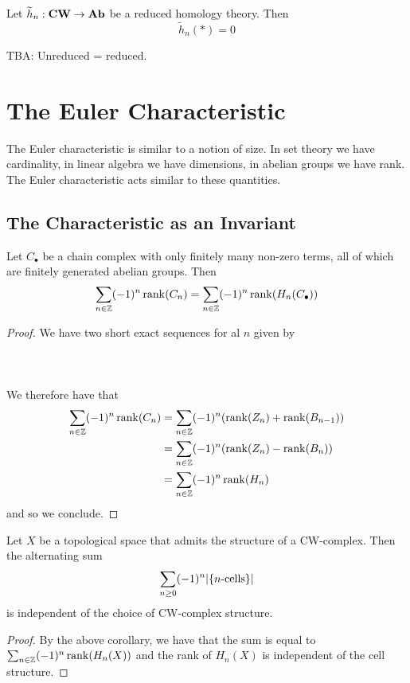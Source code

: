 \documentclass[a4paper]{article}
\begin{document}
\begin{lmm}{}{} Let $\widetilde{h}_n:\bold{CW}\to\bold{Ab}$ be a reduced homology theory. Then $$\widetilde{h}_n(\ast)=0$$
\end{lmm}

TBA: Unreduced = reduced. 

\pagebreak
\section{The Euler Characteristic}
The Euler characteristic is similar to a notion of size. In set theory we have cardinality, in linear algebra we have dimensions, in abelian groups we have rank. The Euler characteristic acts similar to these quantities. 

\subsection{The Characteristic as an Invariant}
\begin{crl}{}{} Let $C_\bullet$ be a chain complex with only finitely many non-zero terms, all of which are finitely generated abelian groups. Then $$\sum_{n\in\mathbb{Z}}(-1)^n\rank(C_n)=\sum_{n\in\mathbb{Z}}(-1)^n\rank(H_n(C_\bullet))$$ \tcbline
\begin{proof}
We have two short exact sequences for al $n$ given by \\~\\
\\~\\
We therefore have that 
\begin{align*}
\sum_{n\in\mathbb{Z}}(-1)^n\rank(C_n)&=\sum_{n\in\mathbb{Z}}(-1)^n(\rank(Z_n)+\rank(B_{n-1}))\\
&=\sum_{n\in\mathbb{Z}}(-1)^n(\rank(Z_n)-\rank(B_n))\\
&=\sum_{n\in\mathbb{Z}}(-1)^n\rank(H_n)
\end{align*}
and so we conclude. 
\end{proof}
\end{crl}

\begin{prp}{}{} Let $X$ be a topological space that admits the structure of a CW-complex. Then the alternating sum $$\sum_{n\geq 0}(-1)^n\abs{\{n\text{-cells}\}}$$ is independent of the choice of CW-complex structure. \tcbline
\begin{proof}
By the above corollary, we have that the sum is equal to $\sum_{n\in\mathbb{Z}}(-1)^n\rank(H_n(X))$ and the rank of $H_n(X)$ is independent of the cell structure. 
\end{proof}
\end{prp}
\end{document}
